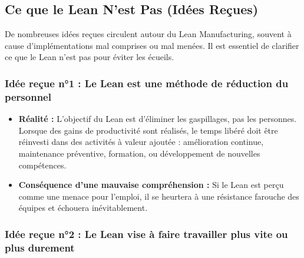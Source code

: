 \documentclass[a4paper,12pt]{article}
\begin{document}
\begin{center}
\end{center}


\subsection{Ce que le Lean N'est Pas (Idées Reçues)}

De nombreuses idées reçues circulent autour du Lean Manufacturing, souvent à cause d'implémentations mal comprises ou mal menées. Il est essentiel de clarifier ce que le Lean n'est pas pour éviter les écueils.

\subsubsection{Idée reçue n°1 : Le Lean est une méthode de réduction du personnel}

\begin{center}
\end{center}

\begin{itemize}
    \item \textbf{Réalité :} L'objectif du Lean est d'éliminer les gaspillages, pas les personnes. Lorsque des gains de productivité sont réalisés, le temps libéré doit être réinvesti dans des activités à valeur ajoutée : amélioration continue, maintenance préventive, formation, ou développement de nouvelles compétences.
    \item \textbf{Conséquence d'une mauvaise compréhension :} Si le Lean est perçu comme une menace pour l'emploi, il se heurtera à une résistance farouche des équipes et échouera inévitablement.
\end{itemize}

\subsubsection{Idée reçue n°2 : Le Lean vise à faire travailler plus vite ou plus durement}
\end{document}
